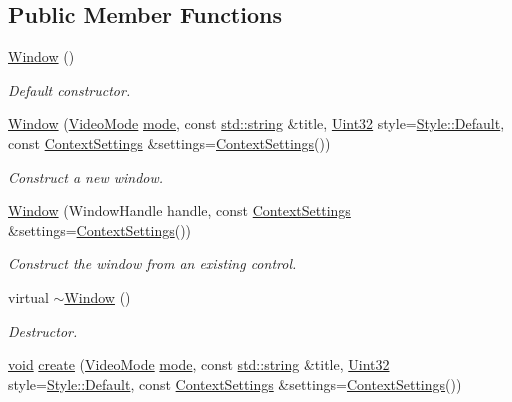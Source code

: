 \subsection*{Public Member Functions}
\begin{DoxyCompactItemize}
\item 
\hyperlink{classsf_1_1_window_a5359122166b4dc492c3d25caf08ccfc4}{Window} ()
\begin{DoxyCompactList}\small\item\em Default constructor. \end{DoxyCompactList}\item 
\hyperlink{classsf_1_1_window_a33341e43c1282a698a39c587f14a2b72}{Window} (\hyperlink{classsf_1_1_video_mode}{Video\-Mode} \hyperlink{gl3_8h_a1e71d9c196e4683cc06c4b54d53f7ef5}{mode}, const \hyperlink{gl3_8h_ac83513893df92266f79a515488701770}{std\-::string} \&title, \hyperlink{namespacesf_aa746fb1ddef4410bddf198ebb27e727c}{Uint32} style=\hyperlink{group__window_ggae1db07091f9745bd223882ba55e7fae2a5597cd420fc461807e4a201c92adea37}{Style\-::\-Default}, const \hyperlink{structsf_1_1_context_settings}{Context\-Settings} \&settings=\hyperlink{structsf_1_1_context_settings}{Context\-Settings}())
\begin{DoxyCompactList}\small\item\em Construct a new window. \end{DoxyCompactList}\item 
\hyperlink{classsf_1_1_window_a6d60912633bff9d33cf3ade4e0201de4}{Window} (Window\-Handle handle, const \hyperlink{structsf_1_1_context_settings}{Context\-Settings} \&settings=\hyperlink{structsf_1_1_context_settings}{Context\-Settings}())
\begin{DoxyCompactList}\small\item\em Construct the window from an existing control. \end{DoxyCompactList}\item 
virtual \hyperlink{classsf_1_1_window_ac30eb6ea5f5594204944d09d4bd69a97}{$\sim$\-Window} ()
\begin{DoxyCompactList}\small\item\em Destructor. \end{DoxyCompactList}\item 
\hyperlink{glutf90_8h_ac778d6f63f1aaf8ebda0ce6ac821b56e}{void} \hyperlink{classsf_1_1_window_a21c51afab5ae676c9c8b325d453958d5}{create} (\hyperlink{classsf_1_1_video_mode}{Video\-Mode} \hyperlink{gl3_8h_a1e71d9c196e4683cc06c4b54d53f7ef5}{mode}, const \hyperlink{gl3_8h_ac83513893df92266f79a515488701770}{std\-::string} \&title, \hyperlink{namespacesf_aa746fb1ddef4410bddf198ebb27e727c}{Uint32} style=\hyperlink{group__window_ggae1db07091f9745bd223882ba55e7fae2a5597cd420fc461807e4a201c92adea37}{Style\-::\-Default}, const \hyperlink{structsf_1_1_context_settings}{Context\-Settings} \&settings=\hyperlink{structsf_1_1_context_settings}{Context\-Settings}())

\end{DoxyCompactItemize}
